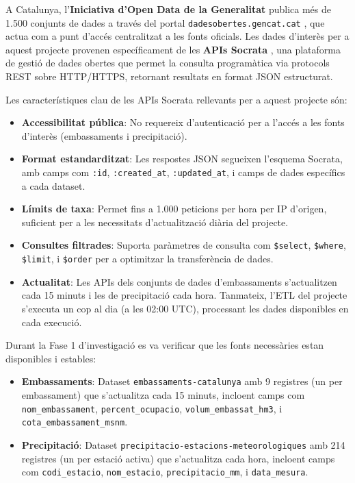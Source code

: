 A Catalunya, l'\textbf{Iniciativa d'Open Data de la Generalitat} publica més de 1.500 conjunts de dades a través del portal \texttt{dadesobertes.gencat.cat} \cite{gencat_dades}, que actua com a punt d'accés centralitzat a les fonts oficials. Les dades d'interès per a aquest projecte provenen específicament de les \textbf{APIs Socrata} \cite{socrata}, una plataforma de gestió de dades obertes que permet la consulta programàtica via protocols REST sobre HTTP/HTTPS, retornant resultats en format JSON estructurat.

Les característiques clau de les APIs Socrata rellevants per a aquest projecte són:
\begin{itemize}
    \item \textbf{Accessibilitat pública}: No requereix d'autenticació per a l'accés a les fonts d'interès (embassaments i precipitació).
    \item \textbf{Format estandarditzat}: Les respostes JSON segueixen l'esquema Socrata, amb camps com \texttt{:id}, \texttt{:created\_at}, \texttt{:updated\_at}, i camps de dades específics a cada dataset.
    \item \textbf{Límits de taxa}: Permet fins a 1.000 peticions per hora per IP d'origen, suficient per a les necessitats d'actualització diària del projecte.
    \item \textbf{Consultes filtrades}: Suporta paràmetres de consulta com \texttt{\$select}, \texttt{\$where}, \texttt{\$limit}, i \texttt{\$order} per a optimitzar la transferència de dades.
    \item \textbf{Actualitat}: Les APIs dels conjunts de dades d'embassaments s'actualitzen cada 15 minuts i les de precipitació cada hora. Tanmateix, l'ETL del projecte s'executa un cop al dia (a les 02:00 UTC), processant les dades disponibles en cada execució.
\end{itemize}

Durant la Fase 1 d'investigació es va verificar que les fonts necessàries estan disponibles i estables:
\begin{itemize}
    \item \textbf{Embassaments}: Dataset \texttt{embassaments-catalunya} amb 9 registres (un per embassament) que s'actualitza cada 15 minuts, incloent camps com \texttt{nom\_embassament}, \texttt{percent\_ocupacio}, \texttt{volum\_embassat\_hm3}, i \texttt{cota\_embassament\_msnm}.
    \item \textbf{Precipitació}: Dataset \texttt{precipitacio-estacions-meteorologiques} amb 214 registres (un per estació activa) que s'actualitza cada hora, incloent camps com \texttt{codi\_estacio}, \texttt{nom\_estacio}, \texttt{precipitacio\_mm}, i \texttt{data\_mesura}.
\end{itemize}

